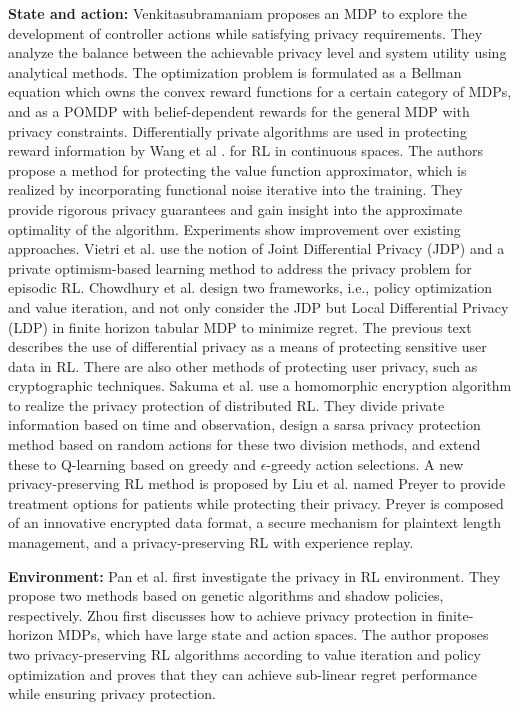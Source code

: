 \documentclass[acmsmall]{acmart}
\begin{document}
\textbf{State and action: }Venkitasubramaniam \cite{6736549} proposes an MDP to explore the development of controller actions while satisfying privacy requirements. They analyze the balance between the achievable privacy level and system utility using analytical methods. The optimization problem is formulated as a Bellman equation which owns the convex reward functions for a certain category of MDPs, and as a POMDP with belief-dependent rewards for the general MDP with privacy constraints.
Differentially private algorithms are used in protecting reward information by Wang et al .\cite{NEURIPS2019_6646b06b} for RL in continuous spaces. The authors propose a method for protecting the value function approximator, which is realized by incorporating functional noise iterative into the training. They provide rigorous privacy guarantees and gain insight into the approximate optimality of the algorithm. Experiments show improvement over existing approaches.
Vietri et al. \cite{pmlr-v119-vietri20a} use the notion of Joint Differential Privacy (JDP) and a private optimism-based learning method to address the privacy problem for episodic RL. Chowdhury et al. \cite{Chowdhury_Zhou_2022} 
design two frameworks, i.e., policy optimization and value iteration, and not only consider the JDP but Local Differential Privacy (LDP) in finite horizon tabular MDP to minimize regret. The previous text describes the use of differential privacy as a means of protecting sensitive user data in RL. There are also other methods of protecting user privacy, such as cryptographic techniques. Sakuma et al. \cite{10.1145/1390156.1390265} use a homomorphic encryption algorithm to realize the privacy protection of distributed RL. They divide private information based on time and observation, design a sarsa privacy protection method based on random actions for these two division methods, and extend these to Q-learning based on greedy and $\epsilon$-greedy action selections. 
A new privacy-preserving RL method is proposed by Liu et al. \cite{8630059}
named Preyer to provide treatment options for patients while protecting their privacy. Preyer is composed of an innovative encrypted data format, a secure mechanism for plaintext length management, and a privacy-preserving RL with experience replay.

\textbf{Environment: } Pan et al. \cite{10.5555/3306127.3331715} first investigate the privacy in RL environment. They propose two methods based on genetic algorithms and shadow policies, respectively. Zhou \cite{10.1145/3508028} first discusses how to achieve privacy protection in finite-horizon MDPs, which have large state and action spaces. The author proposes two privacy-preserving RL algorithms according to value iteration and policy optimization and proves that they can achieve sub-linear regret performance while ensuring privacy protection. 
\end{document}
